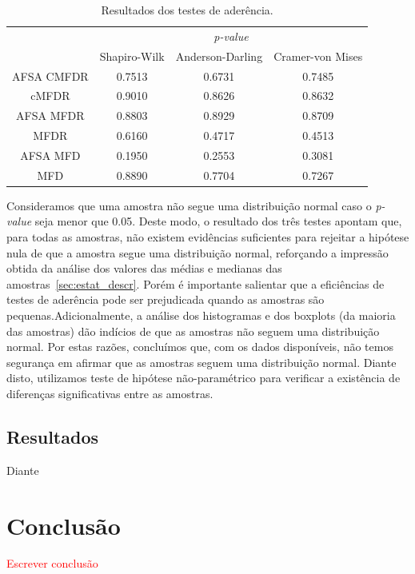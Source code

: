 \documentclass[conference]{IEEEtran}
\begin{document}
\begin{table}[h]
	\centering
	\caption{Resultados dos testes de aderência.}
	\label{tab:aderencia}
	\begin{tabular}{c|ccc}
		\hline
		& \multicolumn{3}{c}{\textit{p-value}}      \\
		\cline{2-4}
		& Shapiro-Wilk & Anderson-Darling  & Cramer-von Mises\\
		\hline
		AFSA CMFDR  	& 0.7513       & 0.6731           & 0.7485 \\
		cMFDR 				 & 0.9010       & 0.8626          & 0.8632 \\
		AFSA MFDR  		 & 0.8803       & 0.8929          & 0.8709 \\
		MFDR  				 & 0.6160       & 0.4717            & 0.4513 \\
		AFSA MFD   		  & 0.1950       &  0.2553          & 0.3081 \\
		MFD   				  & 0.8890       &  0.7704          & 0.7267 \\
		\hline
	\end{tabular}
\end{table}

Consideramos que uma amostra não segue uma distribuição normal caso o \textit{p-value} seja menor que 0.05. Deste modo, o resultado dos três testes apontam que, para todas as amostras, não existem evidências suficientes para rejeitar a hipótese nula de que a amostra segue uma distribuição normal, reforçando a impressão obtida da análise dos valores das médias e medianas das amostras~\ref{sec:estat_descr}. Porém é importante salientar que a eficiências de testes de aderência pode ser prejudicada quando as amostras são pequenas.Adicionalmente, a análise dos histogramas e dos boxplots (da maioria das amostras) dão indícios de que as amostras não seguem uma distribuição normal. Por estas razões, concluímos que, com os dados disponíveis, não temos segurança em afirmar que as amostras seguem uma distribuição normal. Diante disto, utilizamos teste de hipótese não-paramétrico para verificar a existência de diferenças significativas entre as amostras.


\subsection{Resultados}

Diante 

\section{Conclusão}
\label{sec:conclusao}

\textcolor{red}{Escrever conclusão}




% 

\end{document}
